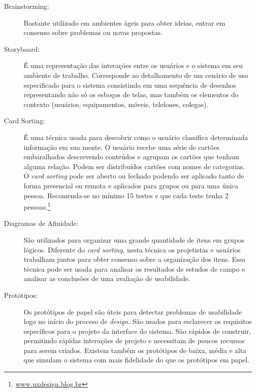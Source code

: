 \begin{description}

\item[Brainstorming:]

	Bastante utilizado em ambientes ágeis para obter ideias, entrar em consenso sobre problemas ou novas propostas.

\item[Storyboard:]

É uma representação das interações entre os usuários e o sistema em seu ambiente de trabalho. Corresponde ao detalhamento de um cenário de uso especificado para o sistema consistindo em uma sequência de desenhos representando não só os esboços de telas, mas também os elementos do contexto (usuários, equipamentos, móveis, telefones, colegas).

\item[Card Sorting:]

	É uma técnica usada para descobrir como o usuário classifica determinada informação em sua mente. O usuário recebe uma série de cartões embaralhados descrevendo conteúdos e agrupam os cartões que tenham alguma relação. Podem ser distribuídos cartões com nomes de categorias. 
%
O \textit{card sorting} pode ser aberto ou fechado podendo ser aplicado tanto de forma presencial ou remota e aplicados para grupos ou para uma única pessoa. Recomenda-se no mínimo 15 testes e que cada teste tenha 2 pessoas.\footnote{\url{www.uxdesign.blog.br}}
	
\item[Diagramas de Afinidade:]

	São utilizados para organizar uma grande quantidade de itens em grupos lógicos. Diferente do \textit{card sorting}, nesta técnica os projetistas e usuários trabalham juntos para obter consenso sobre a organização dos itens. Essa técnica pode ser usada para analisar os resultados de estudos de campo e analisar as conclusões de uma avaliação de usabilidade.

\item[Protótipos:]

	Os protótipos de papel são úteis para detectar problemas de usabilidade logo no início do proceso de \emph{design}. São usados para esclarecer os requisitos específicos para o projeto da interface do sistema. São rápidos de construir, permitindo rápidas interações de projeto e necessitam de poucos recursos para serem criados. 
	Existem também os protótipos de baixa, média e alta que simulam o sistema com mais fidelidade do que os protótipos em papel. 
\end{description}

